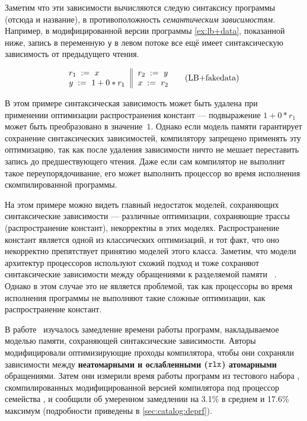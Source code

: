 Заметим что эти зависимости вычисляются следую 
синтаксису программы (отсюда и название), 
в противоположность \emph{семантическим зависимостям}. 
Например, в модифицированной версии 
программы \ref{ex:lb+data}, показанной ниже, 
запись в переменную \texttt{y} в левом потоке все ещё 
имеет синтаксическую зависимость от предыдущего чтения. 

\begin{equation*}
\inarrII{
  \readInst{}{r_1}{x}           \\
  \writeInst{}{y}{1 + 0 * r_1}  \\
}{
  \readInst{}{r_2}{y}      \\
  \writeInst{}{x}{r_2}     \\
}
\tag{LB+fakedata}\label{ex:lb+fakedata}
\end{equation*}

В этом примере синтаксическая зависимость может быть удалена
при применении оптимизации распространения констант ---
подвыражение $1 + 0 * r_1$ может быть преобразовано в значение~$1$.
Однако если модель памяти гарантирует сохранение синтаксических зависимостей,
компилятору запрещено применять эту оптимизацию, 
так как после удаления зависимости ничто не мешает 
переставить запись до предшествующего чтения. 
Даже если сам компилятор не выполнит такое переупорядочивание, 
его может выполнить процессор во время исполнения 
скомпилированной программы. 

На этом примере можно видеть главный недостаток моделей, 
сохраняющих синтаксические зависимости --- 
различные оптимизации, сохраняющие трассы
(\eg распространение констант), некорректны в этих моделях. 
Распространение констант является одной из 
классических оптимизаций, и тот факт, 
что оно некорректно препятствует принятию 
моделей этого класса. 
Заметим, что модели архитектур процессоров 
используют схожий подход и тоже 
сохраняют синтаксические зависимости 
между обращениями к разделяемой памяти%
~\cite{Sarkar-al:PLDI11, Alglave-al:TOPLAS14, Pulte-al:POPL18}.
Однако в этом случае это не является проблемой, 
так как процессоры во время исполнения программы 
не выполняют такие сложные оптимизации, 
как распространение констант.

В работе~\cite{Ou-Demsky:OOPSLA18} изучалось 
замедление времени работы программ, накладываемое моделью памяти, 
сохраняющей синтаксические зависимости. 
Авторы модифицировали оптимизирующие проходы компилятора, 
чтобы они сохраняли зависимости между 
\textbf{неатомарными и ослабленными ($\mathtt{rlx}$) атомарными} обращениями. 
Затем они измерили время работы программ из тестового набора \SPECCPU,
скомпилированных модифицированной версией компилятора \LLVM 
под процессор семейства , и сообщили 
об умеренном замедлении на 3.1\% в среднем и 17.6\% максимум
(подробности приведены в \ref{sec:catalog:deprf}). 

